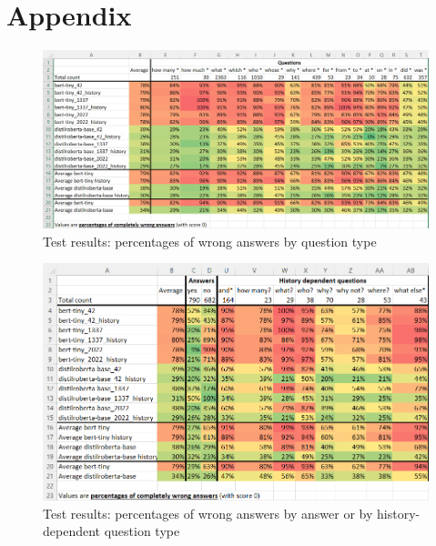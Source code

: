 \documentclass[11pt]{article}
\begin{document}
%



\appendix
\section{Appendix}

\begin{figure}
    \centering
    \includegraphics[width=\textwidth]{img/worst_results_1.png}
    \caption{Test results: percentages of wrong answers by question type}
    \label{fig:wrong_1}
\end{figure}

\begin{figure}
    \centering
    \includegraphics[width=\textwidth]{img/worst_results_2.png}
    \caption{Test results: percentages of wrong answers by answer or by history-dependent question type}
    \label{fig:wrong_2}
\end{figure}
\end{document}

